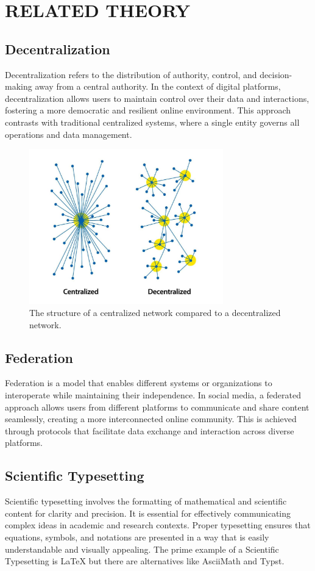 \chapter{RELATED THEORY}

\section{Decentralization}
Decentralization refers to the distribution of authority, control, and decision-making away from a central authority. In the context of digital platforms, decentralization allows users to maintain control over their data and interactions, fostering a more democratic and resilient online environment. This approach contrasts with traditional centralized systems, where a single entity governs all operations and data management. 
\begin{figure}[h]
  \centering
    \includegraphics[width=0.75\textwidth]{Graphics/centvsdecent.jpg} %
    \caption{The structure of a centralized network compared to a decentralized network.}
    \label{fig:example}
\end{figure}
\section{Federation}
Federation is a model that enables different systems or organizations to interoperate while maintaining their independence. In social media, a federated approach allows users from different platforms to communicate and share content seamlessly, creating a more interconnected online community. This is achieved through protocols that facilitate data exchange and interaction across diverse platforms.

\section{Scientific Typesetting}
Scientific typesetting involves the formatting of mathematical and scientific content for clarity and precision. It is essential for effectively communicating complex ideas in academic and research contexts. Proper typesetting ensures that equations, symbols, and notations are presented in a way that is easily understandable and visually appealing. The prime example of a Scientific Typesetting is LaTeX but there are alternatives like AsciiMath and Typst.

